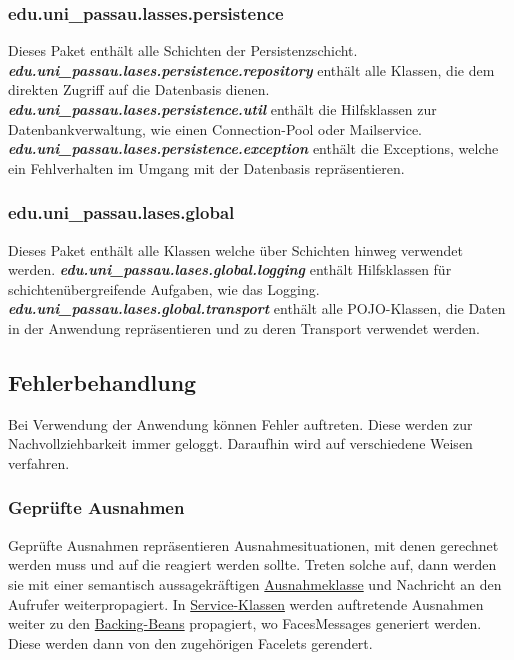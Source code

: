 \subsubsection{edu.uni\_passau.lasses.persistence}\label{arch:persistence}
Dieses Paket enthält alle Schichten der Persistenzschicht.
\newline\newline
\textbf{\emph{edu.uni\_passau.lases.persistence.repository}}\label{arch:repository}
enthält alle Klassen, die dem direkten Zugriff auf die Datenbasis dienen.
\newline\newline
\textbf{\emph{edu.uni\_passau.lases.persistence.util}}
enthält die Hilfsklassen zur Datenbankverwaltung, wie einen
Connection-Pool oder Mailservice.
\newline\newline
\textbf{\emph{edu.uni\_passau.lases.persistence.exception}}
enthält die Exceptions, welche ein Fehlverhalten im Umgang mit der
Datenbasis repräsentieren.

\subsubsection{edu.uni\_passau.lases.global}
Dieses Paket enthält alle Klassen welche über Schichten hinweg
verwendet werden.
\newline\newline
\textbf{\emph{edu.uni\_passau.lases.global.logging}}
enthält Hilfsklassen für schichtenübergreifende Aufgaben, wie das Logging.
\newline\newline
\textbf{\emph{edu.uni\_passau.lases.global.transport}}\label{arch:transport}
enthält alle POJO-Klassen, die Daten in der Anwendung repräsentieren und zu deren
Transport verwendet werden.


\subsection{Fehlerbehandlung}
Bei Verwendung der Anwendung können Fehler auftreten. Diese werden zur Nachvollziehbarkeit
immer geloggt. Daraufhin wird auf verschiedene Weisen verfahren.

\subsubsection{Geprüfte Ausnahmen}
Geprüfte Ausnahmen repräsentieren Ausnahmesituationen, mit
denen gerechnet werden muss und auf die reagiert werden sollte.
Treten solche auf, dann werden sie mit einer semantisch aussagekräftigen
\hyperref[arch:busex]{Ausnahmeklasse} und Nachricht
an den Aufrufer weiterpropagiert.
In \hyperref[arch:service]{Service-Klassen} werden auftretende Ausnahmen weiter zu den
\hyperref[arch:backing]{Backing-Beans} propagiert, wo FacesMessages %
generiert werden.
Diese werden dann von den zugehörigen Facelets %
gerendert.

